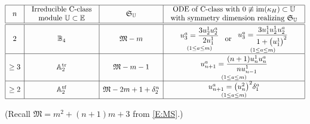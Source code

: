 \documentclass[10pt,a4paper]{amsart}
\DeclareMathOperator{\img}{im}
\DeclareMathOperator{\tf}{tf}
\DeclareMathOperator{\tr}{tr}
\newcommand\fM{\mathfrak{M}}
\newcommand\fS{\mathfrak{S}}
\newcommand{\R}{\mathbb{R}}
\newcommand\bbE{\mathbb{E}}
\newcommand\bbU{\mathbb{U}}
\newcommand\bbA{\mathbb{A}}
\newcommand\bbB{\mathbb{B}}
\numberwithin{equation}{section}
\begin{document}
\begin{table}[h]\renewcommand{\arraystretch}{1.5}
\centering	
$\begin{array}{|c|c|c|c|} \hline
n& \begin{array}{c}
\text{Irreducible C-class}\\ \text{module } \bbU\subset \bbE
\end{array} &\fS_{\bbU} & \begin{array}{c}
\text{ODE of C-class with } 0\not\equiv \img(\kappa_H) \subset \bbU\\ \text{with symmetry dimension realizing } \fS_\bbU
\end{array} \\ \hline\hline
2 & \bbB_4 & \fM -m &\begin{array}{c}
\underset{(1 \le a \le m)}{u_3^a= \displaystyle\frac{3u_2^1 u_2^a}{2u^1_{1}}}
\end{array} \  \text{or}\  \begin{array}{c}
\underset{(1 \le a \le m)}{u_3^a= \displaystyle\frac{3u_1^1u_2^{1^{\vphantom{1}}} u_2^a}{1 + \bigl(u^1_1\bigr)^2}}\\
\end{array}\\\hline
\ge 3 & \bbA_2^{\tr}& \fM -m-1 & \begin{array}{c}
\underset{(1 \le a \le m)}{u_{n+1}^a= \displaystyle\frac{(n+1)u_n^{1^{\vphantom{1}}} u_n^a}{nu^1_{n-1}}}	\\
\end{array}\\	\hline		
\ge 2& \bbA_2^{\tf} & \fM -2m +1 +\delta_2^n &
\begin{array}{c}
\underset{(1 \le a \le m)}{u_{n+1}^a= \bigl(u_n^2\bigr)^2\delta_1^a}	\\
\end{array} \\ \hline
\end{array}$

\vspace{1mm}

(Recall $\fM = m^2+(n+1)m+3$ from \eqref{E:MS}.)

\caption{Classification over $\R$ of submaximally symmetric vector ODEs \eqref{ODE} of C-class of order $n+1 \geq 3$.}
\label{Tab:CM}
\end{table}
\end{document}
